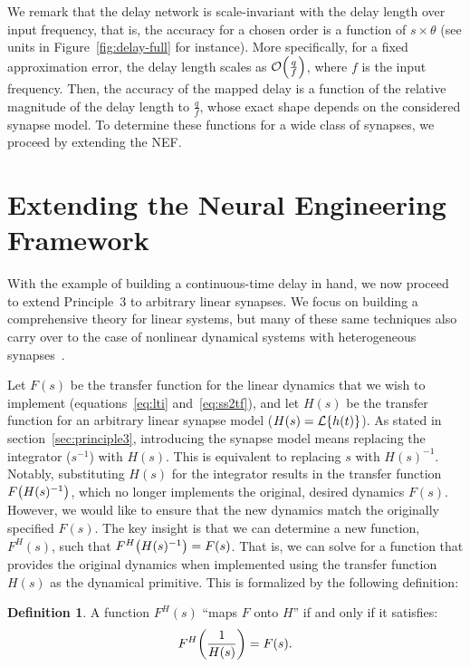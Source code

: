 \documentclass[12pt]{article}
\theoremstyle{definition}
\newtheorem{definition}{Definition}[section]
\let\originalleft\left
\let\originalright\right
\renewcommand{\left}{\mathopen{}\mathclose\bgroup\originalleft}
\renewcommand{\right}{\aftergroup\egroup\originalright}
\begin{document}
We remark that the delay network is scale-invariant with the delay length over input frequency, that is, the accuracy for a chosen order is a function of $s \times \theta$ (see units in Figure~\ref{fig:delay-full} for instance). %
More specifically, for a fixed approximation error, the delay length scales as $\mathcal{O}\left( \frac{q}{f} \right)$, where $f$ is the input frequency.
Then, the accuracy of the mapped delay is a function of the relative magnitude of the delay length to $\frac{q}{f}$, whose exact shape depends on the considered synapse model.
To determine these functions for a wide class of synapses, we proceed by extending the NEF.

\section{Extending the Neural Engineering Framework}
\label{sec:extensions}

With the example of building a continuous-time delay in hand, we now proceed to extend Principle~3 to arbitrary linear synapses. %
We focus on building a comprehensive theory for linear systems, but many of these same techniques also carry over to the case of nonlinear dynamical systems with heterogeneous synapses~\citep{voelker2017iscas, voelker2017neuromorphic}.

Let $F(s)$ be the transfer function for the linear dynamics that we wish to implement (equations~\ref{eq:lti} and~\ref{eq:ss2tf}), and let $H(s)$ be the transfer function for an arbitrary linear synapse model ($H(s) = \mathcal{L} \left\{ h(t) \right\}$).
As stated in section~\ref{sec:principle3}, introducing the synapse model means replacing the integrator ($s^{-1}$) with $H(s)$.
This is equivalent to replacing $s$ with $H(s)^{-1}$.
Notably, substituting $H(s)$ for the integrator results in the transfer function $F \left( H(s)^{-1} \right)$, which no longer implements the original, desired dynamics $F(s)$. %
However, we would like to ensure that the new dynamics match the originally specified $F(s)$.
The key insight is that we can determine a new function, $F^H(s)$, such that $F^{H}\left( H(s)^{-1} \right) = F(s)$.
That is, we can solve for a function that provides the original dynamics when implemented using the transfer function $H(s)$ as the dynamical primitive.
This is formalized by the following definition:
\begin{definition} \label{def:maps-onto}
A function $F^{H}(s)$ ``maps $F$ onto $H$'' if and only if it satisfies:
\begin{align} \label{eq:maps-onto}
F^{H}\left( \frac{1}{H(s)} \right) = F(s) \text{.}
\end{align}
\end{definition}
\end{document}
